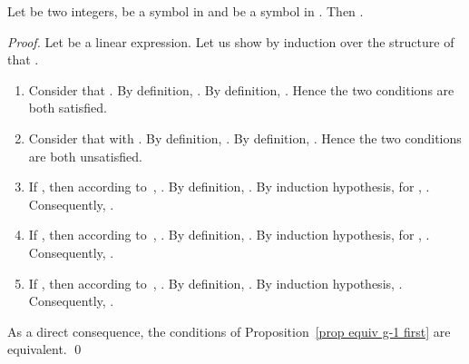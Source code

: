 \documentclass{llncs}
\begin{document}
\begin{proposition}\label{prop equiv g-1 first}
Let  be two integers,  be a symbol in  and  be a symbol in . Then   .
\end{proposition}
\begin{proof}
  Let  be a linear expression. Let us show by induction over the structure of  that .
  \begin{enumerate}
    \item Consider that . By definition, . By definition, . Hence the two conditions are both satisfied.
    \item Consider that  with . By definition, . By definition, . Hence the two conditions are both unsatisfied.
    \item If , then according to~\cite{lata}, . By definition, . By induction hypothesis, for , . Consequently,     .
    \item If , then according to~\cite{lata}, . By definition, . By induction hypothesis, for , . Consequently,   .
    \item If , then according to~\cite{lata}, . By definition, . By induction hypothesis, . Consequently,   .
  \end{enumerate}  
  As a direct consequence, the conditions of Proposition~\ref{prop equiv g-1 first} are equivalent.
  \qed
\end{proof} 
\end{document}
